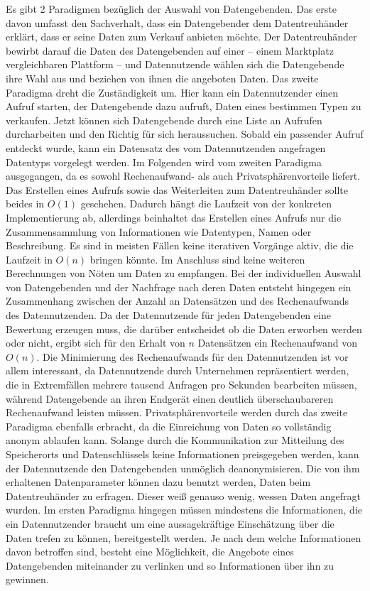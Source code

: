 \documentclass[
	fontsize=12pt,
	headings=small,
	parskip=half,           %
	bibliography=totoc,
	numbers=noenddot,       %
	open=any,               %
]{scrreprt}
\begin{document}
Es gibt 2 Paradigmen bezüglich der Auswahl von Datengebenden. Das erste davon umfasst den Sachverhalt, dass ein Datengebender dem Datentreuhänder erklärt, dass er seine Daten zum Verkauf anbieten möchte. Der Datentreuhänder bewirbt darauf die Daten des Datengebenden auf einer -- einem Marktplatz vergleichbaren Plattform -- und Datennutzende wählen sich die Datengebende ihre Wahl aus und beziehen von ihnen die angeboten Daten. Das zweite Paradigma dreht die Zuständigkeit um. Hier kann ein Datennutzender einen Aufruf starten, der Datengebende dazu aufruft, Daten eines bestimmen Typen zu verkaufen. Jetzt können sich Datengebende durch eine Liste an Aufrufen durcharbeiten und den Richtig für sich heraussuchen. Sobald ein passender Aufruf entdeckt wurde, kann ein Datensatz des vom Datennutzenden angefragen Datentyps vorgelegt werden. 
Im Folgenden wird vom zweiten Paradigma ausgegangen, da es sowohl Rechenaufwand- als auch Privatsphärenvorteile liefert. Das Erstellen eines Aufrufs sowie das Weiterleiten zum Datentreuhänder sollte beides in $O(1)$ geschehen. Dadurch hängt die Laufzeit von der konkreten Implementierung ab, allerdings beinhaltet das Erstellen eines Aufrufs nur die Zusammensammlung von Informationen wie Datentypen, Namen oder Beschreibung. Es sind in meisten Fällen keine iterativen Vorgänge aktiv, die die Laufzeit in $O(n)$ bringen könnte. Im Anschluss sind keine weiteren Berechnungen von Nöten um Daten zu empfangen. Bei der individuellen Auswahl von Datengebenden und der Nachfrage nach deren Daten entsteht hingegen ein Zusammenhang zwischen der Anzahl an Datensätzen und des Rechenaufwands des Datennutzenden. Da der Datennutzende für jeden Datengebenden eine Bewertung erzeugen muss, die darüber entscheidet ob die Daten erworben werden oder nicht, ergibt sich für den Erhalt von $n$ Datensätzen ein Rechenaufwand von $O(n)$. Die Minimierung des Rechenaufwands für den Datennutzenden ist vor allem interessant, da Datennutzende durch Unternehmen repräsentiert werden, die in Extremfällen mehrere tausend Anfragen pro Sekunden bearbeiten müssen, während Datengebende an ihren Endgerät einen deutlich überschaubareren Rechenaufwand leisten müssen.
Privatsphärenvorteile werden durch das zweite Paradigma ebenfalls erbracht, da die Einreichung von Daten so vollständig anonym ablaufen kann. Solange durch die Kommunikation zur Mitteilung des Speicherorts und Datenschlüssels keine Informationen preisgegeben werden, kann der Datennutzende den Datengebenden unmöglich deanonymisieren. Die von ihm erhaltenen Datenparameter können dazu benutzt werden, Daten beim Datentreuhänder zu erfragen. Dieser weiß genauso wenig, wessen Daten angefragt wurden. Im ersten Paradigma hingegen müssen mindestens die Informationen, die ein Datennutzender braucht um eine aussagekräftige Einschätzung über die Daten trefen zu können, bereitgestellt werden. Je nach dem welche Informationen davon betroffen sind, besteht eine Möglichkeit, die Angebote eines Datengebenden miteinander zu verlinken und so Informationen über ihn zu gewinnen.
\end{document}
